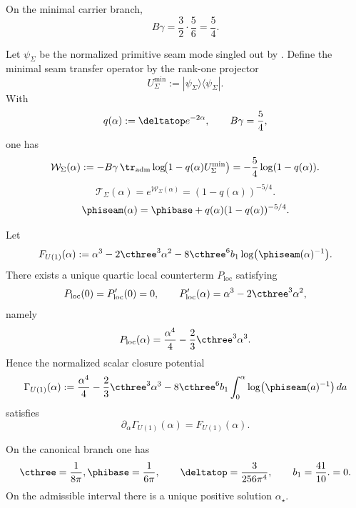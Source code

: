 \begin{proposition}
\label{prop:carrier-susceptibility-exponent}
On the minimal carrier branch,
\[
B\gamma=\frac32\cdot\frac56=\frac54.
\]
\end{proposition}
\begin{definition}
\label{def:exact-seam-generating-function}
Let $\psi_{\Sigma}$ be the normalized primitive seam mode singled out by
. Define the minimal seam transfer operator by the rank-one
projector
\[
U_{\Sigma}^{\min}:=|\psi_{\Sigma}\rangle\langle\psi_{\Sigma}|.
\]
With
\[
q(\alpha):=\deltatop e^{-2\alpha},
\qquad
B\gamma=\frac54,
\]
one has
\[
\mathcal W_{\Sigma}(\alpha)
:=
-B\gamma\,\tr_{\mathrm{adm}}\log\!\bigl(1-q(\alpha)U_{\Sigma}^{\min}\bigr)
=-\frac54\log(1-q(\alpha)).
\]
\[
\mathcal T_{\Sigma}(\alpha)=e^{\mathcal W_{\Sigma}(\alpha)}=(1-q(\alpha))^{-5/4}.
\]
\begin{equation}
\label{eq:phi-opening}
\phiseam(\alpha)=\phibase+q(\alpha)(1-q(\alpha))^{-5/4}.
\end{equation}
\end{definition}

\begin{proposition}
\label{prop:log-det-variation-u1}
Let
\[
F_{U(1)}(\alpha):=\alpha^3-2\cthree^3\alpha^2-8\cthree^6 b_1\log\bigl(\phiseam(\alpha)^{-1}\bigr).
\]
There exists a unique quartic local counterterm $P_{\mathrm{loc}}$ satisfying
\[
P_{\mathrm{loc}}(0)=P_{\mathrm{loc}}'(0)=0,
\qquad
P_{\mathrm{loc}}'(\alpha)=\alpha^3-2\cthree^3\alpha^2,
\]
namely
\[
P_{\mathrm{loc}}(\alpha)=\frac{\alpha^4}{4}-\frac23\cthree^3\alpha^3.
\]
Hence the normalized scalar closure potential
\[
\Gamma_{U(1)}(\alpha)
:=
\frac{\alpha^4}{4}-\frac23\cthree^3\alpha^3
-8\cthree^6 b_1\int_0^\alpha \log\bigl(\phiseam(a)^{-1}\bigr)\,da
\]
satisfies
\[
\partial_{\alpha}\Gamma_{U(1)}(\alpha)=F_{U(1)}(\alpha).
\]
\end{proposition}


\iffalse
\begin{theorem}
\label{thm:exact-electromagnetic-closure}
\label{thm:alpha-canonical}
On the canonical branch one has
\[
\cthree=\frac{1}{8\pi},
\phibase=\frac{1}{6\pi},
\qquad
\deltatop=\frac{3}{256\pi^4},
\qquad
b_1=\frac{41}{10}.
=0.
\]
On the admissible interval there is a unique positive solution $\alpha_\star$.
\end{theorem}

